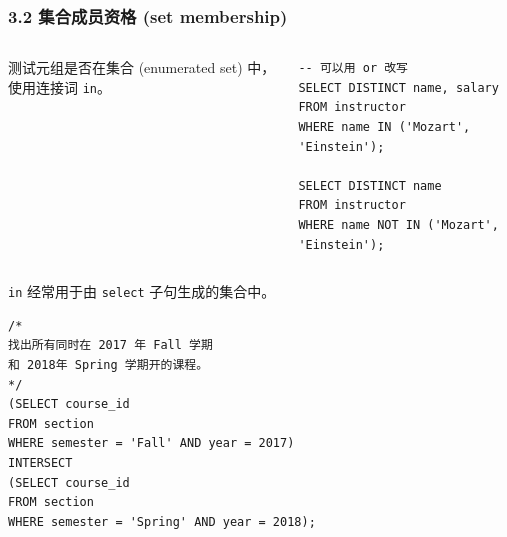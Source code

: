 \documentclass[aspectratio=169, 14pt]{beamer}
\begin{document}
\begin{frame}[fragile]
    \frametitle{3.2 集合成员资格 (set membership)}
    \begin{columns}

    测试元组是否在集合 (enumerated set) 中，使用连接词 \texttt{in}。

    \begin{verbatim}
-- 可以用 or 改写
SELECT DISTINCT name, salary
FROM instructor
WHERE name IN ('Mozart', 'Einstein');

SELECT DISTINCT name
FROM instructor
WHERE name NOT IN ('Mozart', 'Einstein');
    \end{verbatim}

    \end{columns}

\end{frame}

\begin{frame}[fragile]
\texttt{in} 经常用于由 \texttt{select} 子句生成的集合中。

\begin{verbatim}
/*
找出所有同时在 2017 年 Fall 学期
和 2018年 Spring 学期开的课程。
*/
(SELECT course_id
FROM section
WHERE semester = 'Fall' AND year = 2017)
INTERSECT
(SELECT course_id
FROM section
WHERE semester = 'Spring' AND year = 2018);
\end{verbatim}

\end{frame}
\end{document}
